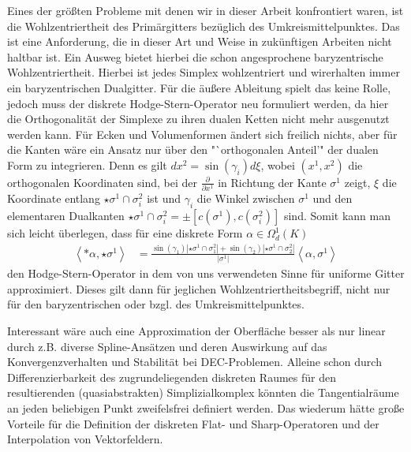 Eines der größten Probleme mit denen wir in dieser Arbeit konfrontiert waren, ist die Wohlzentriertheit des Primärgitters bezüglich des
Umkreismittelpunktes. 
Das ist eine Anforderung, die in dieser Art und Weise in zukünftigen Arbeiten nicht haltbar ist.
Ein Ausweg bietet hierbei die schon angesprochene baryzentrische Wohlzentriertheit.
Hierbei ist jedes Simplex wohlzentriert und wirerhalten immer ein baryzentrischen Dualgitter.
Für die äußere Ableitung spielt das keine Rolle, jedoch muss der diskrete Hodge-Stern-Operator neu formuliert werden, da hier die
Orthogonalität der Simplexe zu ihren dualen Ketten nicht mehr ausgenutzt werden kann. 
Für Ecken und Volumenformen ändert sich freilich nichts, aber für die Kanten wäre ein Ansatz nur über den "`orthogonalen Anteil'" der dualen
Form zu integrieren.
Denn es gilt \( dx^{2}= \sin\left( \gamma_{i} \right) d\xi \), 
wobei \( \left( x^{1},x^{2} \right) \) die orthogonalen Koordinaten sind,
bei der \( \frac{\partial}{\partial x^{1}} \) in Richtung der Kante \( \sigma^{1} \) zeigt,
\( \xi \) die Koordinate entlang \( \star\sigma^{1}\cap\sigma^{2}_{i} \) ist
und \( \gamma_{i} \) die Winkel zwischen \( \sigma^{1} \) und den elementaren Dualkanten
\( \star\sigma^{1}\cap\sigma^{2}_{i} = \pm \left[ c(\sigma^{1}),c(\sigma^{2}_{i})  \right] \) sind.
Somit kann man sich leicht überlegen, dass für eine diskrete Form \( \alpha\in\Omega^{1}_{d}(K) \)
\begin{align}
  \left\langle *\alpha, \star\sigma^{1} \right\rangle
      &= \frac{\sin\left( \gamma_{1} \right)\left| \star\sigma^{1}\cap\sigma^{2}_{1} \right|
              +\sin\left( \gamma_{2} \right)\left| \star\sigma^{1}\cap\sigma^{2}_{2} \right| }
              {\left| \sigma^{1} \right|}
           \left\langle \alpha,\sigma^{1} \right\rangle
\end{align}
den Hodge-Stern-Operator in dem von uns verwendeten Sinne für uniforme Gitter approximiert.
Dieses gilt dann für jeglichen Wohlzentriertheitsbegriff, nicht nur für den baryzentrischen oder bzgl. des Umkreismittelpunktes.

Interessant wäre auch eine Approximation der Oberfläche besser als nur linear durch z.B. diverse Spline-Ansätzen und deren Auswirkung auf das Konvergenzverhalten und
Stabilität bei DEC-Problemen. 
Alleine schon durch Differenzierbarkeit des zugrundeliegenden diskreten Raumes für den resultierenden (quasiabstrakten) Simplizialkomplex
könnten die Tangentialräume an jeden beliebigen Punkt zweifelsfrei definiert werden.
Das wiederum hätte große Vorteile für die Definition der diskreten Flat- und Sharp-Operatoren und der Interpolation von Vektorfeldern.

